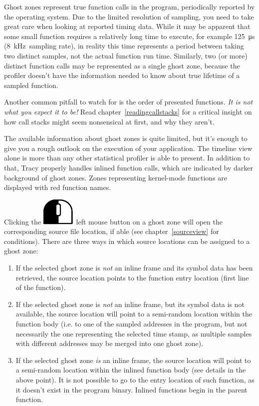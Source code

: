 \documentclass[hidelinks,titlepage,a4paper]{article}
\newcommand{\LMB}{\includegraphics[height=.8\baselineskip]{icons/lmb}}
\begin{document}
Ghost zones represent true function calls in the program, periodically reported by the operating system. Due to the limited resolution of sampling, you need to take great care when looking at reported timing data. While it may be apparent that some small function requires a relatively long time to execute, for example 125~\si{\micro\second} (8~kHz~sampling rate), in reality this time represents a period between taking two distinct samples, not the actual function run time. Similarly, two (or more) distinct function calls may be represented as a single ghost zone, because the profiler doesn't have the information needed to know about true lifetime of a sampled function.

Another common pitfall to watch for is the order of presented functions. \emph{It is not what you expect it to be!} Read chapter~\ref{readingcallstacks} for a critical insight on how call stacks might seem nonsensical at first, and why they aren't.

The available information about ghost zones is quite limited, but it's enough to give you a rough outlook on the execution of your application. The timeline view alone is more than any other statistical profiler is able to present. In addition to that, Tracy properly handles inlined function calls, which are indicated by darker background of ghost zones. Zones representing kernel-mode functions are displayed with red function names.

Clicking the \LMB{}~left mouse button on a ghost zone will open the corresponding source file location, if able (see chapter~\ref{sourceview} for conditions). There are three ways in which source locations can be assigned to a ghost zone:

\begin{enumerate}
\item If the selected ghost zone is \emph{not} an inline frame and its symbol data has been retrieved, the source location points to the function entry location (first line of the function).
\item If the selected ghost zone is \emph{not} an inline frame, but its symbol data is not available, the source location will point to a semi-random location within the function body (i.e. to one of the sampled addresses in the program, but not necessarily the one representing the selected time stamp, as multiple samples with different addresses may be merged into one ghost zone).
\item If the selected ghost zone \emph{is} an inline frame, the source location will point to a semi-random location within the inlined function body (see details in the above point). It is not possible to go to the entry location of such function, as it doesn't exist in the program binary. Inlined functions begin in the parent function.
\end{enumerate}
\end{document}
